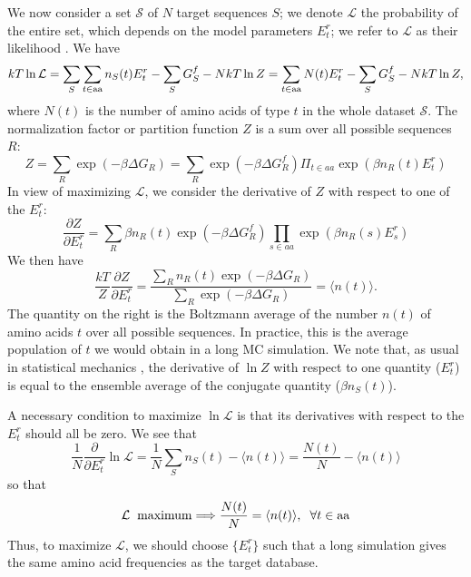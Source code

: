 \documentclass[12pt]{article}
\begin{document}
We now consider a set ${\mathcal S}$ of $N$ target sequences $S$; we denote ${\mathcal L}$ the probability of
the entire set, which depends on the model parameters $E^r_t$; we refer to ${\mathcal L}$ as their likelihood
\cite{Kleinman06}. We have
\begin{equation}
kT \ln {\mathcal L} = \sum_S \sum_{t \in \rm aa} n_S(t) E^r_t - \sum_S G^f_S - N kT \ln Z
                    = \sum_{t \in \rm aa} N(t) E^r_t - \sum_S G^f_S - N kT \ln Z,
\end{equation}
where $N(t)$ is the number of amino acids of type $t$ in the whole dataset ${\mathcal S}$.
The normalization factor or partition function $Z$ is a sum over all possible sequences $R$:
\begin{equation}
Z = \sum_R \exp(-\beta \Delta G_R) = \sum_R \exp(-\beta \Delta G^f_R) \Pi_{t \in aa} \exp(\beta n_R(t) E^r_t)
\end{equation}
In view of maximizing ${\mathcal L}$, we consider the derivative of $Z$ with respect to one of the $E^r_t$:
\begin{equation}
\frac{ \partial Z }{ \partial E^r_t } = 
   \sum_R \beta n_R(t) \exp (-\beta \Delta G^f_R) \prod_{s \in aa} \exp(\beta n_R(s) E^r_s) 
\end{equation}
We then have
\begin{equation}
\frac{kT}{Z} \frac{ \partial Z }{ \partial E^r_t }
   = \frac{ \sum_R n_R(t) \exp(-\beta \Delta G_R) }{ \sum_R \exp(-\beta \Delta G_R) } = \langle n(t) \rangle.
\end{equation}
The quantity on the right is the Boltzmann average of the number $n(t)$ of amino acids $t$ over all possible
sequences. In practice, this is the average population of $t$ we would obtain in a long MC simulation. We note
that, as usual in statistical mechanics \cite{FowlerBK}, the derivative of $\ln Z$ with respect to one
quantity ($E^r_t$) is equal to the ensemble average of the conjugate quantity ($\beta n_S(t)$).

A necessary condition to maximize $\ln {\mathcal L}$ is that its derivatives with respect to the $E^r_t$ should
all be zero. We see that
\begin{equation}
\frac{1}{N} \frac{\partial}{\partial E^r_t} \ln {\mathcal L} = \frac{1}{N} \sum_S n_S(t) - \langle n(t) \rangle 
   = \frac{N(t)}{N} - \langle n(t) \rangle
\end{equation}
so that 
\begin{equation}  \label{eq:optimum}
{\mathcal L} \hspace*{2mm} {\rm maximum} \Longrightarrow \frac{N(t)}{N} = \langle n(t) \rangle, 
\hspace*{2mm} \forall t \in {\rm aa}
\end{equation}
Thus, to maximize ${\mathcal L}$, we should choose $\{E^r_t\}$ such that a long simulation gives the same
amino acid frequencies as the target database.
\end{document}
